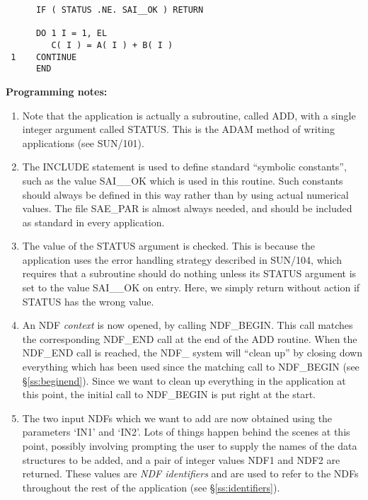 \documentclass[twoside,11pt]{article}
\newcommand{\htmlref}[2]{#1}
\newcommand{\xref}[3]{#1}
\newcommand{\st}[1]{{\em{#1}}}
\begin{document}
\begin{verbatim}
      IF ( STATUS .NE. SAI__OK ) RETURN                       
                                                              
      DO 1 I = 1, EL                                          
         C( I ) = A( I ) + B( I )                             
 1    CONTINUE                                                
      END                                                     
\end{verbatim}
\normalsize

{\bf Programming notes:}

\begin{enumerate}

\item Note that the application is actually a subroutine, called ADD,
with a single integer argument called STATUS.  This is the ADAM method
of writing applications (see \xref{SUN/101}{sun101}{}).

\item The INCLUDE statement is used to define standard ``symbolic
constants'', such as the value SAI\_\_OK which is used in this
routine.  Such constants should always be defined in this way rather
than by using actual numerical values.  The file SAE\_PAR is almost
always needed, and should be included as standard in every
application.

\item The value of the STATUS argument is checked.  This is because
the application uses the error handling strategy described in
\xref{SUN/104}{sun104}{inherited_status}, which requires that a
subroutine should do nothing unless its STATUS argument is set to the
value SAI\_\_OK on entry.  Here, we simply return without action if
STATUS has the wrong value.

\item An NDF \st{context\/} is now opened, by calling \htmlref{NDF\_BEGIN}{NDF_BEGIN}. 
This call matches the corresponding \htmlref{NDF\_END}{NDF_END} call at the end of the ADD
routine. 
When the NDF\_END call is reached, the NDF\_ system will ``clean up'' by
closing down everything which has been used since the matching call to
NDF\_BEGIN (see \S\ref{ss:beginend}). 
Since we want to clean up everything in the application at this point, the 
initial call to NDF\_BEGIN is put right at the start. 

\item The two input NDFs which we want to add are now obtained using the
parameters `IN1' and `IN2'. 
Lots of things happen behind the scenes at this point, possibly involving
prompting the user to supply the names of the data structures to be added,
and a pair of integer values NDF1 and NDF2 are returned. 
These values are \st{NDF identifiers\/} and are used to refer to the NDFs
throughout the rest of the application (see \S\ref{ss:identifiers}).


\end{enumerate}
\end{document}
